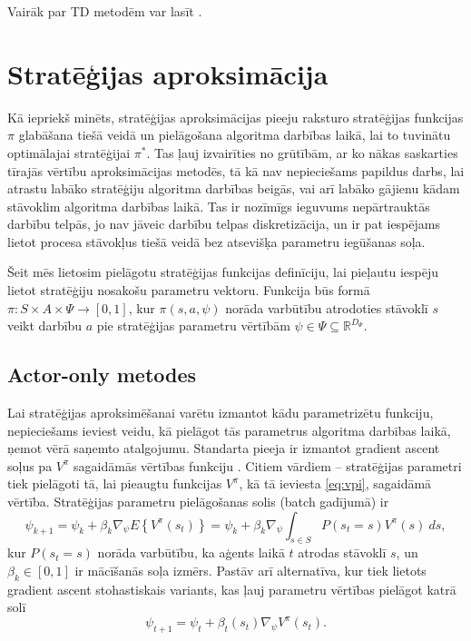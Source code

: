 \documentclass{ludis} %
\begin{document}
Vairāk par TD metodēm var lasīt \autocite{Hasselt2012}.

\section{Stratēģijas aproksimācija}
Kā iepriekš minēts, stratēģijas aproksimācijas pieeju raksturo stratēģijas funkcijas $\pi$ glabāšana tiešā veidā un pielāgošana algoritma darbības laikā, lai to tuvinātu optimālajai stratēģijai $\pi^*$.
Tas ļauj izvairīties no grūtībām, ar ko nākas saskarties tīrajās vērtību aproksimācijas metodēs, tā kā nav nepieciešams papildus darbs, lai atrastu labāko stratēģiju algoritma darbības beigās, vai arī labāko gājienu kādam stāvoklim algoritma darbības laikā.
Tas ir nozīmīgs ieguvums nepārtrauktās darbību telpās, jo nav jāveic darbību telpas diskretizācija, un ir pat iespējams lietot procesa stāvokļus tiešā veidā bez atsevišķa parametru iegūšanas soļa.

Šeit mēs lietosim pielāgotu stratēģijas funkcijas definīciju, lai pieļautu iespēju lietot stratēģiju nosakošu parametru vektoru. Funkcija būs formā $\pi: S \times A \times \Psi \rightarrow [0,1]$, kur $\pi(s, a, \psi)$ norāda varbūtību atrodoties stāvoklī $s$ veikt darbību $a$ pie stratēģijas parametru vērtībām $\psi \in \Psi \subseteq \mathbb{R}^{D_\Psi}$.

\subsection{Actor-only metodes}
 
Lai stratēģijas aproksimēšanai varētu izmantot kādu parametrizētu funkciju, nepieciešams ieviest veidu, kā pielāgot tās parametrus algoritma darbības laikā, ņemot vērā saņemto atalgojumu.
Standarta pieeja ir izmantot gradient ascent soļus pa $V^\pi$ sagaidāmās vērtības funkciju \autocite{williams1992simple} \autocite{sutton2000policy} \autocite{Hasselt2012}.
Citiem vārdiem -- stratēģijas parametri tiek pielāgoti tā, lai pieaugtu funkcijas $V^\pi$, kā tā ieviesta \eqref{eq:vpi}, sagaidāmā vērtība.
Stratēģijas parametru pielāgošanas solis (batch gadījumā) ir
\[
	\psi_{k+1} = \psi_k + \beta_k \nabla_\psi E \left\{V^\pi(s_t)\right\} = \psi_k + \beta_k \nabla_\psi \int_{s \in S} P(s_t = s) V^\pi(s)\ ds,
\]
kur $P(s_t = s)$ norāda varbūtību, ka aģents laikā $t$ atrodas stāvoklī $s$, un $\beta_k \in [0,1]$ ir mācīšanās soļa izmērs.
Pastāv arī alternatīva, kur tiek lietots gradient ascent stohastiskais variants, kas ļauj parametru vērtības pielāgot katrā solī
\begin{equation} \label{eq:stohgrad}
	\psi_{t+1} = \psi_t + \beta_t(s_t) \nabla_\psi V^\pi(s_t).
\end{equation}
\end{document}
